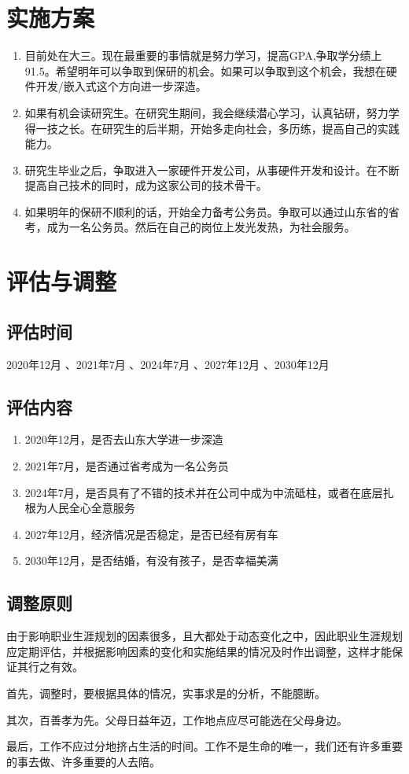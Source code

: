 \documentclass{article}
\begin{document}
\section{实施方案}
\begin{enumerate}[1、]
	\item 目前处在大三。现在最重要的事情就是努力学习，提高GPA,争取学分绩上91.5。希望明年可以争取到保研的机会。如果可以争取到这个机会，我想在硬件开发/嵌入式这个方向进一步深造。
	\item 如果有机会读研究生。在研究生期间，我会继续潜心学习，认真钻研，努力学得一技之长。在研究生的后半期，开始多走向社会，多历练，提高自己的实践能力。
	\item 研究生毕业之后，争取进入一家硬件开发公司，从事硬件开发和设计。在不断提高自己技术的同时，成为这家公司的技术骨干。
	\item 如果明年的保研不顺利的话，开始全力备考公务员。争取可以通过山东省的省考，成为一名公务员。然后在自己的岗位上发光发热，为社会服务。
\end{enumerate}
\par 



\section{评估与调整}
\subsection{评估时间}
2020年12月 、2021年7月 、2024年7月 、2027年12月 、2030年12月
\par
\subsection{评估内容}
\begin{enumerate}[1、]
	\item 2020年12月，是否去山东大学进一步深造
	\item 2021年7月，是否通过省考成为一名公务员
	\item 2024年7月，是否具有了不错的技术并在公司中成为中流砥柱，或者在底层扎根为人民全心全意服务
	\item 2027年12月，经济情况是否稳定，是否已经有房有车
	\item 2030年12月，是否结婚，有没有孩子，是否幸福美满
\end{enumerate}



\par
\subsection{调整原则}
由于影响职业生涯规划的因素很多，且大都处于动态变化之中，因此职业生涯规划应定期评估，并根据影响因素的变化和实施结果的情况及时作出调整，这样才能保证其行之有效。\par
首先，调整时，要根据具体的情况，实事求是的分析，不能臆断。\par
其次，百善孝为先。父母日益年迈，工作地点应尽可能选在父母身边。\par
最后，工作不应过分地挤占生活的时间。工作不是生命的唯一，我们还有许多重要的事去做、许多重要的人去陪。\par
\par
\end{document}
